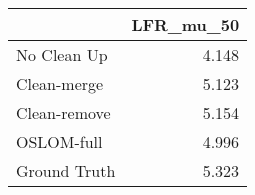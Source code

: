 \begin{tabular}{lr}
\toprule
{} & LFR_mu_50 \\
\midrule
No Clean Up  &     4.148 \\
Clean-merge  &     5.123 \\
Clean-remove &     5.154 \\
OSLOM-full   &     4.996 \\
Ground Truth &     5.323 \\
\bottomrule
\end{tabular}
